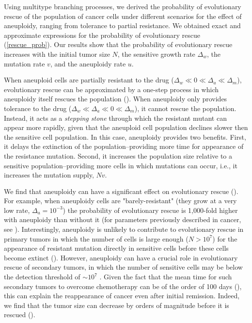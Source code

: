 \documentclass[12pt]{extarticle}
\begin{document}
Using multitype branching processes, we derived the probability of evolutionary rescue of the population of cancer cells under different scenarios for the effect of aneuploidy, ranging from tolerance to partial resistance.
We obtained exact and approximate expressions for the probability of evolutionary rescue (\cref{rescue_prob}).
Our results show that the probability of evolutionary rescue increases with the initial tumor size $N$, the sensitive growth rate $\Delta_w$, the mutation rate $v$, and the aneuploidy rate $u$.

When aneuploid cells are partially resistant to the drug ($\Delta_w\ll0\ll\Delta_a\ll\Delta_m$), evolutionary rescue can be approximated by a one-step process in which aneuploidy itself rescues the population (). 
When aneuploidy only provides tolerance to the drug ($\Delta_w\ll\Delta_a\ll0\ll\Delta_m$), it cannot rescue the population.
Instead, it acts as a \emph{stepping stone} through which the resistant mutant can appear more rapidly, given that the aneuploid cell population declines slower then the sensitive cell population. In this case, aneuploidy provides two benefits. First, it delays the extinction of the population--providing more time for appearance of the resistance mutation. Second, it increases the population size relative to a sensitive population--providing more cells in which mutations can occur, i.e., it increases the mutation supply, $Nv$.

We find that aneuploidy can have a significant effect on evolutionary rescue (). For example, when aneuploidy cells are "barely-resistant" (they grow at a very low rate, $\Delta_a=10^{-3}$) the probability of evolutionary rescue is 1,000-fold higher with aneuploidy than without it (for parameters previously described in cancer, see ).
Interestingly, aneuploidy is unlikely to contribute to evolutionary rescue in primary tumors in which the number of cells is large enough ($N>10^7$) for the appearance of resistant mutation directly in sensitive cells before these cells become extinct ().
However, aneuploidy can have a crucial role in evolutionary rescue of secondary tumors, in which the number of sensitive cells may be below the detection threshold of $\sim10^7$  \citep{bozic2013evolutionary}.
Given the fact that the mean time for such secondary tumors to overcome chemotherapy can be of the order of 100 days (), %
this can explain the reappearance of cancer even after initial remission.
Indeed, we find that the tumor size can decrease by orders of magnitude before it is rescued ().
\end{document}

